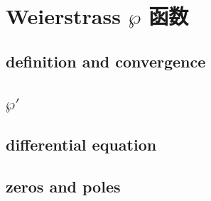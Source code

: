 \section{Weierstrass \texorpdfstring{\(\wp\)}{℘} 函数}
\label{b3:sec:2203}


\subsection{definition and convergence}
\label{b3:subsec:220301}

\subsection{\texorpdfstring{\(\wp'\)}{'}}
\label{b3:subsec:220302}

\subsection{differential equation}
\label{b3:subsec:220303}

\subsection{zeros and poles}
\label{b3:subsec:220304}


